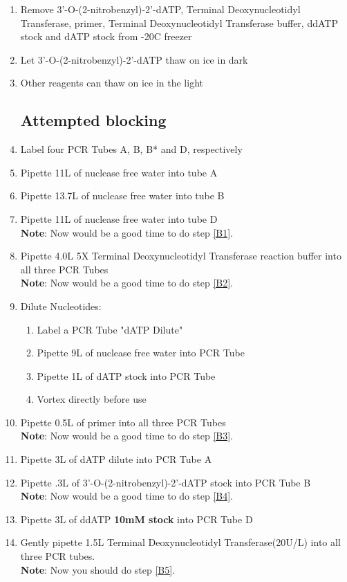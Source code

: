 \documentclass[letterpaper]{article}
\newcommand{\tdt}{Terminal Deoxynucleotidyl Transferase}
\newcommand{\C}{\degree{}C}
\newcommand{\uL}{\micro{}L}
\newcommand{\BdATP}{3'-O-(2-nitrobenzyl)-2'-dATP}
\begin{document}
\begin{enumerate}
\item{Remove \BdATP{}, \tdt{}, primer, \tdt{}  buffer, ddATP stock and dATP stock from -20\C{} freezer}
\item{Let \BdATP{} thaw on ice in dark}
\item{Other reagents can thaw on ice in the light}
\subsection{Attempted blocking}
\item{Label four PCR Tubes A, B, B* and D, respectively}
\item{Pipette 11\uL{} of nuclease free water into tube A}
\item{Pipette 13.7\uL{} of nuclease free water into tube B}
\item{Pipette 11\uL{} of nuclease free water into tube D}\\
	\textbf{Note}: Now would be a good time to do step \ref{B1}.
\item{Pipette 4.0\uL{} 5X \tdt{} reaction buffer into all three PCR Tubes}\\
	\textbf{Note}: Now would be a good time to do step \ref{B2}.
\item{Dilute Nucleotides:
\begin{enumerate}
\item{Label a PCR Tube "dATP Dilute"}
\item{Pipette 9\uL{} of nuclease free water into PCR Tube}
\item{Pipette 1\uL{} of dATP stock into PCR Tube}
\item{Vortex directly before use}
\end{enumerate}
}
\item{Pipette 0.5\uL{} of primer into all three PCR Tubes}\\
	\textbf{Note}: Now would be a good time to do step \ref{B3}.
\item{Pipette 3\uL{} of dATP dilute into PCR Tube A}
\item{Pipette .3\uL{} of \BdATP{} stock into PCR Tube B}\\
	\textbf{Note}: Now would be a good time to do step \ref{B4}.
\item{Pipette 3\uL{} of ddATP \textbf{10mM stock} into PCR Tube D}
\item{Gently pipette 1.5\uL{} \tdt (20U/\uL{}) into all three PCR tubes.}\\
	\textbf{Note}: Now you should do step \ref{B5}.


\end{enumerate}
\end{document}
